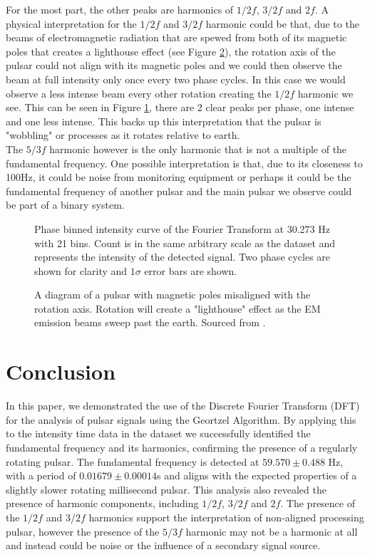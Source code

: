 \documentclass[reqno]{amsart}
\numberwithin{equation}{section}
\numberwithin{figure}{section}
\begin{document}
For the most part, the other peaks are harmonics of $1/2f$, $3/2f$ and $2f$. A physical interpretation for the $1/2f$ and $3/2f$ harmonic could be that, due to the beams of electromagnetic radiation that are spewed from both of its magnetic poles that creates a lighthouse effect (see Figure \ref{fig:pulsar}), the rotation axis of the pulsar could not align with its magnetic poles and we could then observe the beam at full intensity only once every two phase cycles. In this case we would observe a less intense beam every other rotation creating the $1/2f$ harmonic we see. This can be seen in Figure \ref{fig:phasebins_half}, there are 2 clear peaks per phase, one intense and one less intense. This backs up this interpretation that the pulsar is "wobbling" or processes as it rotates relative to earth. \\

The $5/3f$ harmonic however is the only harmonic that is not a multiple of the fundamental frequency. One possible interpretation is that, due to its closeness to 100Hz, it could be noise from monitoring equipment or perhaps it could be the fundamental frequency of another pulsar and the main pulsar we observe could be part of a binary system.

\begin{figure}[ht]
    \centering
    
    \caption{Phase binned intensity curve of the Fourier Transform at 30.273 Hz with 21 bins. Count is in the same arbitrary scale as the dataset and represents the intensity of the detected signal. Two phase cycles are shown for clarity and $1\sigma$ error bars are shown.}
    \label{fig:phasebins_half}
\end{figure}

\begin{figure}[ht]
    \centering
    
    \caption{A diagram of a pulsar with magnetic poles misaligned with the rotation axis. Rotation will create a "lighthouse" effect as the EM emission beams sweep past the earth. Sourced from \cite{knierim_tikz_assortment}.}
    \label{fig:pulsar}
\end{figure}

\section{Conclusion}
In this paper, we demonstrated the use of the Discrete Fourier Transform (DFT) for the analysis of pulsar signals using the Geortzel Algorithm. By applying this to the intensity time data in the dataset we successfully identified the fundamental frequency and its harmonics, confirming the presence of a regularly rotating pulsar. The fundamental frequency is detected at $59.570 \pm 0.488$ Hz, with a period of $0.01679 \pm 0.00014$s and aligns with the expected properties of a slightly slower rotating millisecond pulsar. This analysis also revealed the presence of harmonic components, including $1/2f$, $3/2f$ and $2f$. The presence of the $1/2f$ and $3/2f$ harmonics support the interpretation of non-aligned processing pulsar, however the presence of the $5/3f$ harmonic may not be a harmonic at all and instead could be noise or the influence of a secondary signal source. \\
\end{document}
